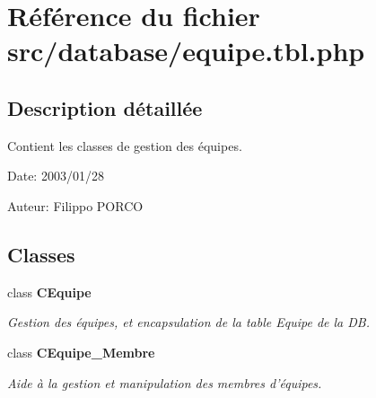 \section{Référence du fichier src/database/equipe.tbl.php}
\label{equipe_8tbl_8php}


\subsection{Description détaillée}
Contient les classes de gestion des équipes. 

\begin{Desc}
\item[Date:]2003/01/28\end{Desc}
\begin{Desc}
\item[Auteur:]Filippo PORCO \end{Desc}


\subsection*{Classes}
\begin{CompactItemize}
\item 
class {\bf CEquipe}
\begin{CompactList}\small\item\em Gestion des équipes, et encapsulation de la table Equipe de la DB. \item\end{CompactList}\item 
class {\bf CEquipe\_\-Membre}
\begin{CompactList}\small\item\em Aide à la gestion et manipulation des membres d'équipes. \item\end{CompactList}\end{CompactItemize}

